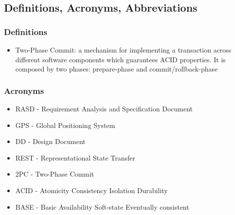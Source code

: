 \subsection{Definitions, Acronyms, Abbreviations}

\subsubsection{Definitions}
\begin{itemize}
\item Two-Phase Commit: a mechanism for implementing a transaction across different software components which guarantees ACID properties. It is composed by two phases: prepare-phase and commit/rollback-phase
\end{itemize}

\subsubsection{Acronyms}
\begin{itemize}
\item RASD - Requirement Analysis and Specification Document
\item GPS - Global Positioning System
\item DD - Design Document
\item REST - Representational State Transfer
\item 2PC - Two-Phase Commit
\item ACID - Atomicity Consistency Isolation Durability
\item BASE - Basic Availability Soft-state Eventually consistent
\end{itemize}
